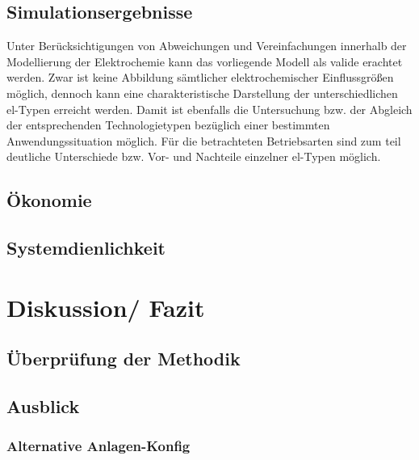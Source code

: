 \documentclass[onecolumn,10pt,titlepage]{article}
\begin{document}
\subsection{Simulationsergebnisse}
Unter Berücksichtigungen von Abweichungen und Vereinfachungen innerhalb der Modellierung der Elektrochemie kann das vorliegende Modell als valide erachtet werden. Zwar ist keine Abbildung sämtlicher elektrochemischer Einflussgrößen möglich, dennoch kann eine charakteristische Darstellung der unterschiedlichen \gls{el}-Typen erreicht werden. Damit ist ebenfalls die Untersuchung bzw. der Abgleich der entsprechenden Technologietypen bezüglich einer bestimmten Anwendungssituation möglich. Für die betrachteten Betriebsarten sind zum teil deutliche Unterschiede bzw. Vor- und Nachteile einzelner \gls{el}-Typen möglich.

\subsection{Ökonomie}
\subsection{Systemdienlichkeit}


\section{Diskussion/ Fazit}

\subsection{Überprüfung der Methodik}
%
%


\subsection{Ausblick}
\subsubsection{Alternative Anlagen-Konfig}
\end{document}
